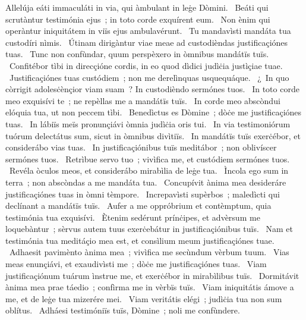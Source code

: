 { Allelúja}
{%
eáti immaculáti in via, qui àmbulant in leġe Dòmini. 
~Beáti qui scrutàntur testimónia ejus~; in toto corde exquírent eum. 
~Non ènim qui operàntur iniquitátem in viïs ejus ambulavérunt. 
~Tu mandavìsti mandáta tua custodíri nìmis. 
~Útinam dirigàntur viae meae ad custodièndas justificaçiónes tuas. 
~Tunc non confùndar, quum perspèxero in òmnibus mandátïs tuïs. 
~Confitébor tìbi in direcçióne cordis, in eo quod dìdici judìċia justìçiae tuae. 
~Justificaçiónes tuas custódiem~; non me derelìnquas usquequáque. 
~¿~In quo còrrigit adolesċènçior viam suam~? In custodièndo sermónes tuos. 
~In toto corde meo exquisívi te~; ne repèllas me a mandátïs tuïs. 
~In corde meo abscòndui elóquia tua, ut non peccem tìbi. 
~Benedìctus es Dòmine~; dòċe me justificaçiónes tuas. 
~In lábiïs meïs pronunçiávi òmnia judìċia oris tui. 
~In via testimoniórum tuórum delectátus sum, sicut in òmnibus divìtiïs. 
~In mandátïs tuïs exerċébor, et considerábo vias tuas. 
~In justificaçiónibus tuïs meditábor~; non oblivíscer sermónes tuos. 
~Retrìbue servo tuo~; vivìfica me, et custódiem sermónes tuos. 
~Revéla òculos meos, et considerábo mirabìlia de leġe tua. 
~Ìncola ego sum in terra~; non abscòndas a me mandáta tua. 
~Concupívit ànima mea desideráre justificaçiónes tuas in òmni tèmpore. 
~Increpavìsti supèrbos~; maledìcti qui declínant a mandátïs tuïs. 
~Aufer a me oppróbrium et contèmptum, quia testimónia tua exquisívi. 
~Ètenim sedérunt prínċipes, et advèrsum me loquebàntur~; sèrvus autem tuus exerċebátur in justificaçiónibus tuïs. 
~Nam et testimónia tua meditáçio mea est, et consìlium meum justificaçiónes tuae. 
~Adhaesit pavimènto ànima mea~; vivìfica me secùndum vèrbum tuum. 
~Vias meas enunçiávi, et exaudivìsti me~; dòċe me justificaçiónes tuas. 
~Viam justificaçiónum tuárum ìnstrue me, et exerċébor in mirabìlibus tuïs. 
~Dormitávit ànima mea prae táedio~; confìrma me in vèrbïs tuïs. 
~Viam iniquitátis ámove a me, et de leġe tua mizerére mei. 
~Viam veritátis elégi~; judìċia tua non sum oblítus. 
~Adháesi testimóniïs tuïs, Dòmine~; noli me confùndere. 
}
